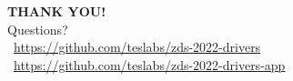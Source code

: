 \documentclass[handout]{beamer}
\begin{document}
\begin{frame}[plain]{}
  \begin{center}
    \huge
    \textbf{THANK YOU!} \\
    Questions? \\
    \vspace{2.5em}
    \normalsize
    \faFilePowerpoint~\url{https://github.com/teslabs/zds-2022-drivers} \\
    \vspace{1em}
    \faGithub~\url{https://github.com/teslabs/zds-2022-drivers-app} \\
  \end{center}
\end{frame}
\end{document}
